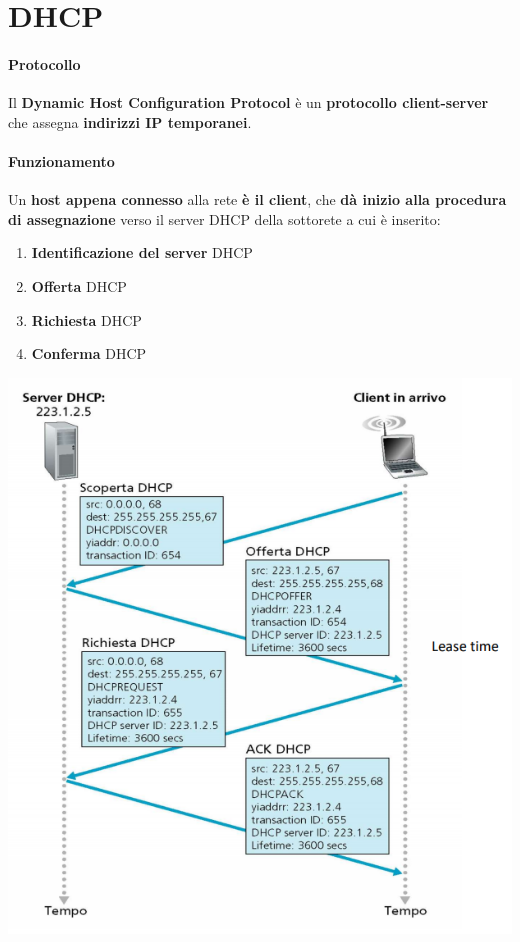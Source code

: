 \documentclass[10pt]{article}
\begin{document}
\section{DHCP}
\begin{multicols}{2}
\paragraph{Protocollo} Il \textbf{Dynamic Host Configuration Protocol} è un \textbf{protocollo client-server} che assegna \textbf{indirizzi IP temporanei}.
\paragraph{Funzionamento} Un \textbf{host appena connesso} alla rete \textbf{è il client}, che \textbf{dà inizio alla procedura di assegnazione} verso il server DHCP della sottorete a cui è inserito:
\begin{enumerate}
\item \textbf{Identificazione del server} DHCP
\item \textbf{Offerta} DHCP
\item \textbf{Richiesta} DHCP
\item \textbf{Conferma} DHCP
\end{enumerate}
\includegraphics[scale=0.6]{dhcpschema.png}
\end{multicols}
\end{document}
